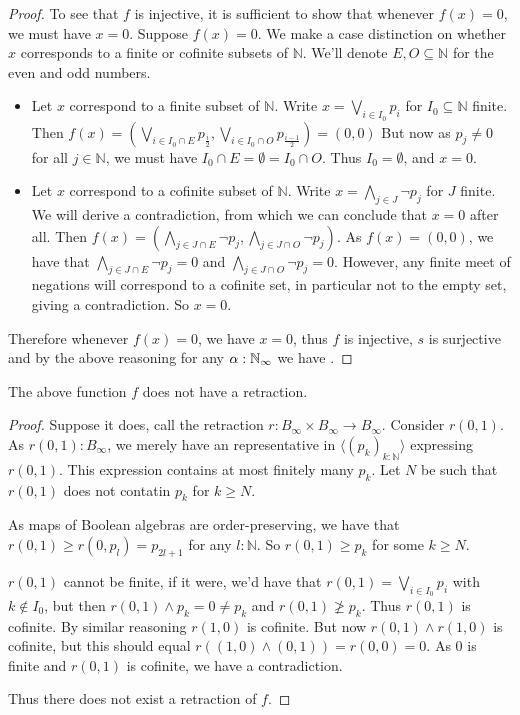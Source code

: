 \documentclass{../util/zariski-small}
\begin{document}
\begin{proof}
  To see that $f$ is injective, it is sufficient to show that whenever $f(x) = 0$, we must have $x = 0$. 
  Suppose $f(x) = 0$. %
  We make a case distinction on whether $x$ corresponds
  to a finite or cofinite subsets of $\mathbb N$. 
  We'll denote $E,O\subseteq \mathbb N$ for the even and odd numbers.
  \begin{itemize}
    \item Let $x$ correspond to a finite subset of $\mathbb N$. Write 
      $x = \bigvee_{i\in I_0} p_i$ for $I_0\subseteq \mathbb N$ finite. 
      Then $f(x) = (\bigvee_{i\in I_0 \cap E } p_{\frac i2} , \bigvee_{i\in I_0 \cap O } p_{\frac {i-1}2} ) = (0,0)$
      But now as $p_j\neq 0$ for all $j\in\mathbb N$, we must have $I_0 \cap E = \emptyset = I_0 \cap O$. 
      Thus $I_0= \emptyset$, and $x = 0$. 
    \item Let $x$ correspond to a cofinite subset of $\mathbb N$. Write 
      $x = \bigwedge_{j\in J} \neg p_j$ for $J$ finite. 
      We will derive a contradiction, from which we can conclude that $x=0$ after all. 
      Then $f(x) = (\bigwedge_{j\in J \cap E } \neg p_j , \bigwedge_{j\in J \cap O } \neg p_j )$. 
      As $f(x) = (0,0)$, we have that 
      $\bigwedge_{j\in J \cap E } \neg p_j =0$ and
      $\bigwedge_{j\in J \cap O } \neg p_j  = 0$.
      However, any finite meet of negations will correspond to a cofinite set,
      in particular not to the empty set, giving a contradiction. 
      So $x = 0$. 
  \end{itemize}
  Therefore whenever $f(x) = 0$, we have $x = 0$, thus $f$ is injective, $s$ is surjective 
  and by the above reasoning for any $\alpha:\mathbb{N}_{\infty}$ we have . 
\end{proof}
\begin{remark}
  The above function $f$ does not have a retraction. 
\begin{proof}
  Suppose it does, call the retraction $r:B_\infty \times B_\infty \to B_\infty$. 
  Consider $r(0,1)$. 
  As $r(0,1):B_\infty$, we merely have an representative in $\langle (p_k)_{k:\mathbb N}\rangle$ 
  expressing $r(0,1)$. This expression contains at most finitely many $p_k$. 
  Let $N$ be such that $r(0,1)$ does not contatin $p_k$ for $k \geq N$. 

  As maps of Boolean algebras are order-preserving, we have that 
  $r(0,1) \geq r(0,p_l) = p_{2l+1}$ for any $l:\mathbb N$. 
  So $r(0,1) \geq p_{k}$ for some $k \geq N$. 

  $r(0,1)$ cannot be finite, if it were, we'd have that  
  $r(0,1) = \bigvee_{i\in I_0} p_i$ with $k\notin I_0$, 
  but then $r(0,1) \wedge p_k = 0\neq p_k$ and $r(0,1) \not \geq p_k$.
  Thus $r(0,1)$ is cofinite. 
  By similar reasoning $r(1,0)$ is cofinite. 
  But now $r(0,1) \wedge r(1,0)$ is cofinite, but this should equal $r((1,0)\wedge (0,1)) = r(0,0) = 0$. 
  As $0$ is finite and $r(0,1)$ is cofinite, we have a contradiction. 

  Thus there does not exist a retraction of $f$. 
\end{proof}
\end{remark} 
\end{document}
